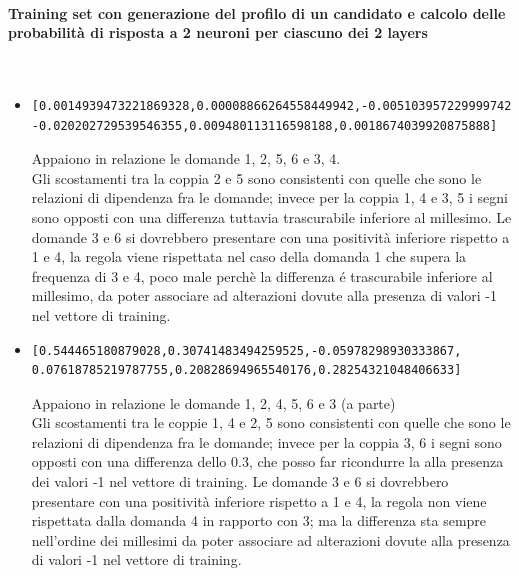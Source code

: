 \paragraph{Training set con generazione del profilo di un candidato e calcolo delle probabilit\`a di risposta a 2 neuroni per ciascuno dei 2 layers}\mbox{}
\label{Training set con generazione del profilo di un candidato e calcolo delle probabilita di risposta a 2 neuroni per ciascuno dei 2 layers}
\\
\noindent
\begin{itemize}
\item \begin{verbatim}[0.0014939473221869328,0.00008866264558449942,-0.0051039572299997425,
-0.020202729539546355,0.009480113116598188,0.0018674039920875888]
\end{verbatim}
Appaiono in relazione le domande 1, 2, 5, 6  e 3, 4.\\
Gli scostamenti tra la coppia 2 e 5 sono consistenti con quelle che sono le relazioni di dipendenza fra le domande; invece per la coppia 1, 4 e 3, 5 i segni sono opposti con una differenza tuttavia trascurabile inferiore al millesimo.
Le domande 3 e 6 si dovrebbero presentare con una positivit\`a inferiore rispetto a 1 e 4, la regola viene rispettata nel caso della domanda 1 che supera la frequenza di 3 e 4, poco male perch\`e la differenza \'e trascurabile inferiore al millesimo, da poter associare ad alterazioni dovute alla presenza di valori -1 nel vettore di training.

\item \begin{verbatim}[0.544465180879028,0.30741483494259525,-0.05978298930333867,
0.07618785219787755,0.20828694965540176,0.28254321048406633]
\end{verbatim}
Appaiono in relazione le domande 1, 2,  4, 5, 6 e 3 (a parte)\\
Gli scostamenti tra le coppie 1, 4 e 2, 5 sono consistenti con quelle che sono le relazioni di dipendenza fra le domande; invece per la coppia 3, 6 i segni sono opposti con una differenza dello 0.3, che posso far ricondurre la alla presenza dei valori -1 nel vettore di training.
Le domande 3 e 6 si dovrebbero presentare con una positivit\`a inferiore rispetto a 1 e 4, la regola non viene rispettata dalla domanda 4 in rapporto con 3; ma la differenza sta sempre nell'ordine dei millesimi da poter associare ad alterazioni dovute alla presenza di valori -1 nel vettore di training.


\end{itemize}
